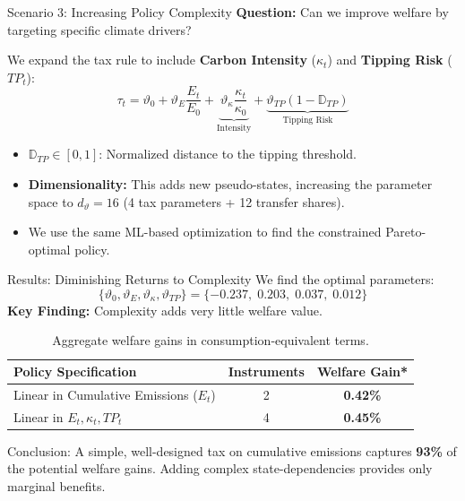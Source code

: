 \documentclass[10pt,aspectratio=169]{beamer}
\begin{document}
\begin{frame}{Scenario 3: Increasing Policy Complexity}
\small
    \textbf{Question:} Can we improve welfare by targeting specific climate drivers?
    \vspace{0.5em}

    We expand the tax rule to include \textbf{Carbon Intensity} ($\kappa_t$) and \textbf{Tipping Risk} ($TP_t$):
    \begin{equation}
        \label{eq:tax_fun_lin_S_kappa_tipping}
        \tau_t = \vartheta_0 + \vartheta_E \frac{E_t}{E_0} + \underbrace{\vartheta_\kappa \frac{\kappa_t}{\kappa_0}}_{\text{Intensity}} + \underbrace{\vartheta_{TP} (1 - \mathbb{D}_{TP})}_{\text{Tipping Risk}}
    \end{equation}
    \begin{itemize}
        \item $\mathbb{D}_{TP} \in [0,1]$: Normalized distance to the tipping threshold.
        \item \textbf{Dimensionality:} This adds new pseudo-states, increasing the parameter space to $d_\vartheta = 16$ (4 tax parameters + 12 transfer shares).
        \item We use the same ML-based optimization to find the constrained Pareto-optimal policy.
    \end{itemize}
\end{frame}

\begin{frame}{Results: Diminishing Returns to Complexity}
\small
    We find the optimal parameters:
    \[
        \{\vartheta_0, \vartheta_E, \vartheta_\kappa, \vartheta_{TP} \} = \{-0.237,\;  0.203, \;  0.037, \;  0.012 \}
    \]
    \textbf{Key Finding:} Complexity adds very little welfare value.
    \begin{table}[h]
        \centering
        \begin{tabular}{lcc}
            \toprule
            \textbf{Policy Specification} & \textbf{Instruments} & \textbf{Welfare Gain*} \\
            \midrule
            Linear in Cumulative Emissions ($E_t$) & 2 & \textbf{0.42\%} \\
            Linear in $E_t, \kappa_t, TP_t$ & 4 & \textbf{0.45\%} \\
            \bottomrule
        \end{tabular}
        \caption{\footnotesize Aggregate welfare gains in consumption-equivalent terms.}
    \end{table}
    \begin{alertblock}{Conclusion:}
        A simple, well-designed tax on cumulative emissions captures \textbf{93\%} of the potential welfare gains. Adding complex state-dependencies provides only marginal benefits.
    \end{alertblock}
\end{frame}
\end{document}

